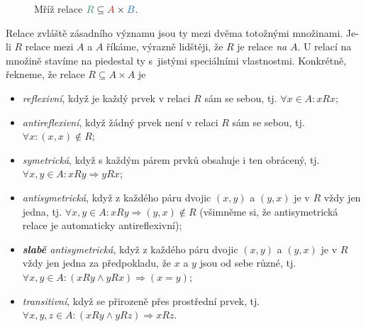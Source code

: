 \begin{figure}[ht]
 \centering

 \caption{Mříž relace $\clg{R} \subseteq \clr{A} \times \clb{B}$.}
 \label{fig:mriz-relace}
\end{figure}

Relace zvláště zásadního významu jsou ty mezi dvěma totožnými množinami. Je-li
$R$ relace mezi $A$ a $A$ říkáme, výrazně lidštěji, že $R$ je relace \emph{na}
$A$. U relací na množině stavíme na piedestal ty s~jistými speciálními
vlastnostmi. Konkrétně, řekneme, že relace $R \subseteq A \times A$ je
\begin{itemize}
 \item \emph{reflexivní}, když je každý prvek v relaci $R$ sám se sebou, tj. $
  \forall x \in A:xRx$;
 \item \emph{antireflexivní}, když žádný prvek není v relaci $R$ sám se sebou,
  tj. $ \forall x:(x,x) \notin R$;
 \item \emph{symetrická}, když s každým párem prvků obsahuje i ten obrácený, tj.
  $ \forall x,y \in A:xRy \Rightarrow yRx$;
 \item \emph{antisymetrická}, když z každého páru dvojic $(x,y)$ a $(y,x)$ je v
  $R$ vždy jen jedna, tj. $ \forall x,y \in A: xRy \Rightarrow (y,x) \notin R$
  (všimněme si, že antisymetrická relace je automaticky antireflexivní);
 \item \emph{\textbf{slabě} antisymetrická}, když z každého páru dvojic $(x,y)$
  a $(y,x)$ je v $R$ vždy jen jedna za předpokladu, že $x$ a $y$ jsou od sebe
  různé, tj. $ \forall x,y \in A: (xRy \wedge yRx) \Rightarrow (x = y)$;
 \item \emph{transitivní}, když se přirozeně  přes prostřední prvek,
  tj. $ \forall x,y,z \in A:(xRy \wedge yRz) \Rightarrow xRz$.
\end{itemize}

